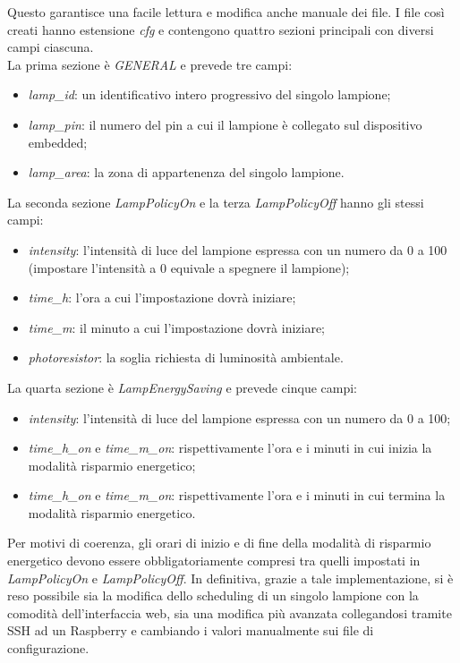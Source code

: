 Questo garantisce una facile lettura e modifica anche manuale dei file. I file così creati hanno estensione \textit{cfg} e contengono quattro sezioni principali con diversi campi ciascuna.
\\La prima sezione è \textit{GENERAL} e prevede tre campi:
\begin{itemize}
 \item \textit{lamp\_id}: un identificativo intero progressivo del singolo lampione;
 \item \textit{lamp\_pin}: il numero del pin a cui il lampione è collegato sul dispositivo embedded;
 \item \textit{lamp\_area}: la zona di appartenenza del singolo lampione.
\end{itemize}
La seconda sezione \textit{LampPolicyOn} e la terza \textit{LampPolicyOff} hanno gli stessi campi:
\begin{itemize}
 \item \textit{intensity}: l'intensità di luce del lampione espressa con un numero da 0 a 100 (impostare l'intensità a 0 equivale a spegnere il lampione);
 \item \textit{time\_h}: l'ora a cui l'impostazione dovrà iniziare;
 \item \textit{time\_m}: il minuto a cui l'impostazione dovrà iniziare;
 \item \textit{photoresistor}: la soglia richiesta di luminosità ambientale.
\end{itemize}
La quarta sezione è \textit{LampEnergySaving} e prevede cinque campi:
\begin{itemize}
 \item \textit{intensity}: l'intensità di luce del lampione espressa con un numero da 0 a 100;
 \item \textit{time\_h\_on} e \textit{time\_m\_on}: rispettivamente l'ora e i minuti in cui inizia la modalità risparmio energetico;
 \item \textit{time\_h\_on} e \textit{time\_m\_on}: rispettivamente l'ora e i minuti in cui termina la modalità risparmio energetico.
\end{itemize}
Per motivi di coerenza, gli orari di inizio e di fine della modalità di risparmio energetico devono essere obbligatoriamente compresi tra quelli impostati in \textit{LampPolicyOn} e \textit{LampPolicyOff}.
In definitiva, grazie a tale implementazione, si è reso possibile sia la modifica dello scheduling di un singolo lampione con la comodità dell'interfaccia web, sia una modifica più avanzata collegandosi tramite SSH ad un Raspberry e cambiando i valori manualmente sui file di configurazione.


